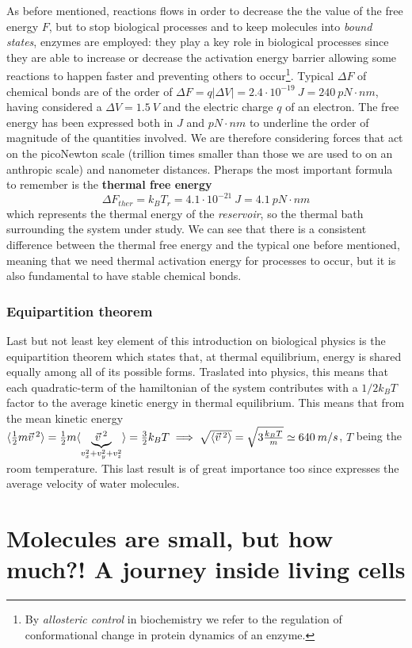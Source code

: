 \documentclass[../main/main.tex]{subfiles}
\begin{document}
As before mentioned, reactions flows in order to decrease the the value of the free energy $F$, but to stop biological processes and to keep molecules into \emph{bound states}, enzymes are employed: they play a key role in biological processes since they are able to increase or decrease the activation energy barrier allowing some reactions to happen faster and preventing others to occur\footnote{By \emph{allosteric control} in biochemistry we refer to the regulation of conformational change in protein dynamics of an enzyme.}.
Typical $\Delta F$ of chemical bonds are of the order of $\Delta F=q|\Delta V|=2.4\cdot10^{-19}\:J=240\:pN\cdot nm$, having considered a $\Delta V=1.5\:V$ and the electric charge $q$ of an electron. The free energy has been expressed both in $J$ and $pN\cdot nm$ to underline the order of magnitude of the quantities involved. We are therefore considering forces that act on the picoNewton scale (trillion times smaller than those we are used to on an anthropic scale) and nanometer distances.
Pheraps the most important formula to remember is the \textbf{thermal free energy} $$\Delta F_{ther}=k_B T_r=4.1\cdot10^{-21}\:J=4.1\:pN\cdot nm$$ which represents the thermal energy of the \emph{reservoir}, so the thermal bath surrounding the system under study. We can see that there is a consistent difference between the thermal free energy and the typical one before mentioned, meaning that we need thermal activation energy for processes to occur, but it is also fundamental to have stable chemical bonds.  

\subsection{Equipartition theorem}
Last but not least key element of this introduction on biological physics is the equipartition theorem which states that, at thermal equilibrium, energy is shared equally among all of its possible forms. Traslated into physics, this means that each quadratic-term of the hamiltonian of the system contributes with a $1/2 k_B T$ factor to the average kinetic energy in thermal equilibrium. 
This means that from the mean kinetic energy $\langle \frac{1}{2}m\vec{v}^{\:2} \rangle=\frac{1}{2}m\langle \underbrace{\vec{v}^{\:2}}_{v_x^2+v_y^2+v_z^2} \rangle=\frac{3}{2}k_B T\implies \sqrt{\langle \vec{v}^{\:2} \rangle}=\sqrt{3\frac{k_B T}{m}}\simeq 640\:m/s$, $T$ being the room temperature. This last result is of great importance too since expresses the average velocity of water molecules. 

\chapter{Molecules are small, but how much?! A journey inside living cells}
\end{document}
